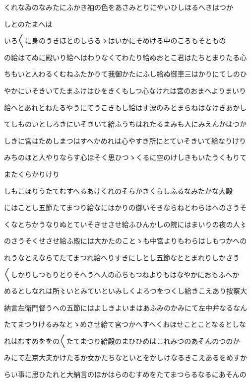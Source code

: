 \documentclass[a4paper,11pt,landscape]{ltjtarticle}
\begin{document}
くれなゐのなみたにふかき袖の色をあさみとりにやいひしほるへきはつか
\par\medskip
しとのたまへは
\par\medskip
いろ〱に身のうきほとのしらるゝはいかにそめける中のころもそともの
\par\medskip
の給はてぬに殿いり給へはわりなくてわたり給ぬおとこ君はたちとまりたる心
\par\medskip
ちもいと人わるくむねふたかりて我御かたにふし給ぬ御車三はかりにてしのひ
\par\medskip
やかにいそきいてたまふけはひをきくもしつ心なけれは宮のおまへよりまいり
\par\medskip
給へとあれとねたるやうにてうこきもし給はす涙のみとまらねはなけきあかし
\par\medskip
てしものいとしろきにいそきいて給ふうちはれたるまみも人にみえんかはつか
\par\medskip
しきに宮はためしまつはすへかめれは心やすき所にとていそきいて給なりけり
\par\medskip
みちのほと人やりならす心ほそく思ひつゝくるに空のけしきもいたうくもりて
\par\medskip
またくらかりけり
\par\medskip
しもこほりうたてむすへるあけくれのそらかきくらしふるなみたかな大殿
\par\medskip
にはことし五節たてまつり給なにはかりの御いそきならねとわらはへのさうそ
\par\medskip
くなとちかうなりぬとていそきせさせ給ふひんかしの院にはまいりの夜の人〻
\par\medskip
のさうそくせさせ給ふ殿には大かたのことゝも中宮よりもわらはしもつかへの
\par\medskip
れうなとえならてたてまつれ給へりすきにしとし五節なととまれりしかさう
\par\medskip
〱しかりしつもりとりそへうへ人の心ちもつねよりもはなやかにおもふへか
\par\medskip
めるとしなれは所〻いとみていといみしくよろつをつくし給きこえあり按察大
\par\medskip
納言左衛門督うへの五節にはよしきよいまはあふみのかみにて左中弁なるなん
\par\medskip
たてまつりけるみなとゝめさせ給て宮つかへすへくおほせことことなるとしな
\par\medskip
れはむすめををの〱たてまつり給殿のまひひめはこれみつのあそんのつのか
\par\medskip
みにて左京大夫かけたるか女かたちなといとをかしけなるきこえあるをめすか
\par\medskip
らい事に思ひたれと大納言のほかはらのむすめをたてまつらるなるにあそんの
\end{document}
